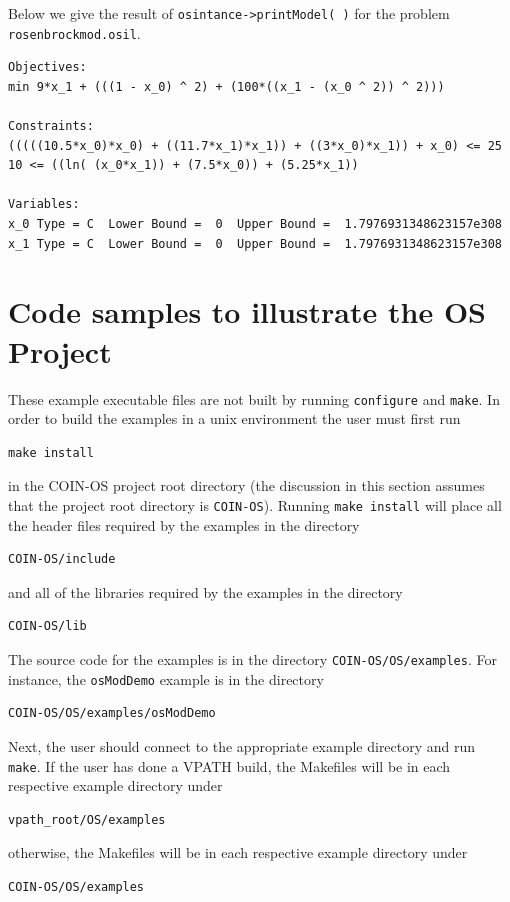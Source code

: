 \documentclass[11pt]{article}
\renewcommand{\_}{{\char"5F}}
\renewcommand{\{}{{\char"7B}}
\renewcommand{\}}{{\char"7D}}
\renewcommand{\^}{{\char"0D}}
\renewcommand{\'}{{\char"0D}}
\begin{document}
\begin{enumerate}[Step 1:]
 
Below we give the result of {\tt osintance->printModel( )} for the problem {\tt rosenbrockmod.osil}.
\begin{verbatim}
Objectives:
min 9*x_1 + (((1 - x_0) ^ 2) + (100*((x_1 - (x_0 ^ 2)) ^ 2)))

Constraints:
(((((10.5*x_0)*x_0) + ((11.7*x_1)*x_1)) + ((3*x_0)*x_1)) + x_0) <= 25  
10 <= ((ln( (x_0*x_1)) + (7.5*x_0)) + (5.25*x_1))

Variables:
x_0 Type = C  Lower Bound =  0  Upper Bound =  1.7976931348623157e308
x_1 Type = C  Lower Bound =  0  Upper Bound =  1.7976931348623157e308
\end{verbatim}
 


\section{Code samples to illustrate the OS Project}\label{section:examples}

These example executable files are not built by running {\tt configure} and {\tt make}.  In order to build the examples
in a unix environment the user must first run
\begin{verbatim}
make install
\end{verbatim}
in the COIN-OS project root directory (the discussion in this section assumes that the project root directory is
{\tt COIN-OS}).  Running {\tt make install}  will  place all the header files required by the examples in the directory
\begin{verbatim}
COIN-OS/include
\end{verbatim}
and all of the libraries required by the examples in the directory
\begin{verbatim}
COIN-OS/lib
\end{verbatim}
The source code for the examples is in the directory {\tt COIN-OS/OS/examples}.  For instance, the {\tt osModDemo}
example is in the directory
\begin{verbatim}
COIN-OS/OS/examples/osModDemo
\end{verbatim}
Next, the user should connect to the appropriate example directory and run {\tt make}.
If the user has done a VPATH build, the Makefiles will be in each respective example directory under
\begin{verbatim}
vpath_root/OS/examples
\end{verbatim}
otherwise, the Makefiles will be in each respective example directory under
\begin{verbatim}
COIN-OS/OS/examples
\end{verbatim}


\end{enumerate}
\end{document}
